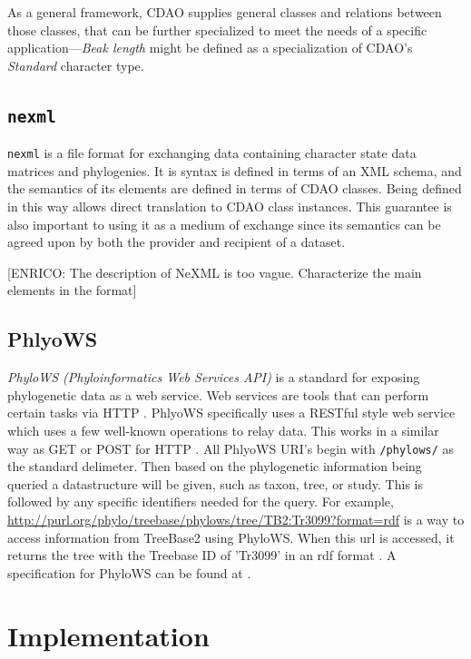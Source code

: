 \documentclass[10pt]{bmc_article}
\newenvironment{bmcformat}{\begin{raggedright}\baselineskip20pt\sloppy\setboolean{publ}{false}}{\end{raggedright}\baselineskip20pt\sloppy}
\begin{document}
\begin{bmcformat}
  As a general framework, CDAO supplies general classes and relations between those classes, 
  that can be further specialized to meet the needs of a specific application---\emph{Beak length}
   might be defined as a specialization of CDAO's \textit{Standard} 
  character type.
   

\subsection*{\tt nexml}
  {\tt nexml} \cite{nexml} is a file format for exchanging data containing character state data
  matrices and phylogenies. It is syntax is defined in terms of an XML schema, and the semantics of its elements
  are defined in terms of CDAO classes. Being defined in this way allows direct translation to CDAO class instances.
  This guarantee is also important to using it as a medium of exchange since its semantics can be agreed upon by
  both the provider and recipient of a dataset.
  
  [ENRICO: The description of NeXML is too vague. Characterize the main elements in the format]

\subsection*{PhlyoWS}
  \emph{PhyloWS (Phyloinformatics Web Services API)} is a standard for exposing 
  phylogenetic data as a web service. Web services are tools that can perform certain tasks via HTTP \cite{WebService}.
  PhlyoWS specifically uses a RESTful style web service which uses a few well-known operations to relay data\cite{PhyloWS}\cite{WebService}.
  This works in a similar way as GET or POST for HTTP  \cite{WebService}.  All PhlyoWS URI's begin with {\tt /phylows/} as the 
  standard delimeter. Then based on the phylogenetic information being queried a datastructure will be given, such as taxon, tree, or study.
  This is followed by any specific identifiers needed for the query.  For example, \url{http://purl.org/phylo/treebase/phylows/tree/TB2:Tr3099?format=rdf}
  is a way to access information from TreeBase2 using PhyloWS.  When this url is accessed, it returns the tree with the Treebase ID of 'Tr3099' in an
  rdf format \cite{treebasePhyloWS}. A specification for PhyloWS can be found at \cite{PhyloWS}.
\section*{Implementation}


\end{bmcformat}
\end{document}
